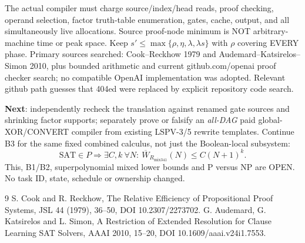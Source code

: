 \documentclass[11pt]{article}
\begin{document}
The actual compiler must charge source/index/head reads, proof checking, operand selection, factor truth-table enumeration, gates, cache, output, and all simultaneously live allocations. Source proof-node minimum is NOT arbitrary-machine time or peak space. Keep \(s'\le\max\{\rho,\eta,\lambda,\lambda s\}\) with \(\rho\) covering EVERY phase. Primary sources searched: Cook--Reckhow 1979 and Audemard--Katsirelos--Simon 2010, plus bounded arithmetic and current github.com/openai proof checker search; no compatible OpenAI implementation was adopted. Relevant github path guesses that 404ed were replaced by explicit repository code search.

\noindent\textbf{Next}: independently recheck the translation against renamed gate sources and shrinking factor supports; separately prove or falsify an \emph{all-DAG} paid global-XOR/CONVERT compiler from existing LSPV-3/5 rewrite templates. Continue B3 for the same fixed combined calculus, not just the Boolean-local subsystem:
\[
\mathrm{SAT}\in P\Longrightarrow\exists C,k\ \forall N:\ 
\overline W_{R_{\mathrm{mix341}}}(N)\le C(N+1)^k.
\]
This, B1/B2, superpolynomial mixed lower bounds and P versus NP are OPEN. No task ID, state, schedule or ownership changed.
\begin{thebibliography}{9}
 S. Cook and R. Reckhow, The Relative Efficiency of Propositional Proof Systems, JSL 44 (1979), 36--50, DOI 10.2307/2273702.
\bibitem{AKS} G. Audemard, G. Katsirelos and L. Simon, A Restriction of Extended Resolution for Clause Learning SAT Solvers, AAAI 2010, 15--20, DOI 10.1609/aaai.v24i1.7553.
\end{thebibliography}
\end{document}
